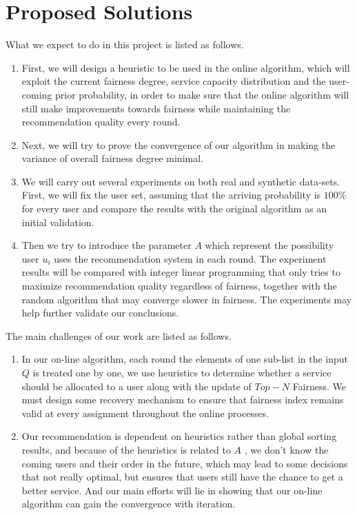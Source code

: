 \section{Proposed Solutions}



What we expect to do in this project is listed as follows.
\begin{enumerate}
    \item First, we will design a heuristic to be used in the online algorithm, which will exploit the current fairness degree, service capacity distribution and the user-coming prior probability, in order to make sure that the online algorithm will still make improvements towards fairness while maintaining the recommendation quality every round.
    \item Next, we will try to prove the convergence of our algorithm in making the variance of overall fairness degree minimal.
    \item We will carry out several experiments on both real and synthetic data-sets. First, we will fix the user set, assuming that the arriving probability is $100\%$ for every user  and compare the results with the original algorithm as an initial validation.
    \item Then we try to introduce the parameter $A$ which represent the possibility user $u_i$ uses the recommendation system in each round. The experiment results will be compared with integer linear programming that only tries to maximize recommendation quality regardless of fairness, together with the random algorithm that may converge slower in fairness. The experiments may help further validate our conclusions.
\end{enumerate}

The main challenges of our work are listed as follows.

\begin{enumerate}
    \item In our on-line algorithm, each round the elements of one sub-list in the input $Q$ is treated one by one, we use heuristics to determine whether a service should be allocated to a user along with the update of $Top-N$ Fairness. We must design some recovery mechanism to ensure that fairness index remains valid at every assignment throughout the online processes.
    \item Our recommendation is dependent on heuristics rather than global sorting results, and because of the heuristics is related to $A$ , we don't know the coming users and their order in the future, which may lead to some decisions that not really optimal, but ensures that users still have the chance to get a better service. And our main efforts will lie in showing that our on-line algorithm can gain the convergence with iteration.
\end{enumerate}
